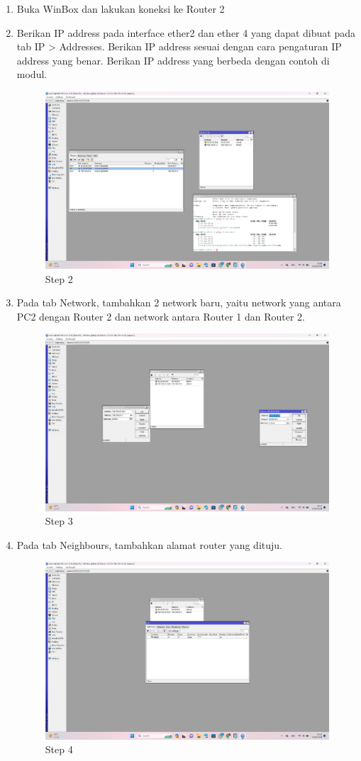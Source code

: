 \begin{enumerate}
	\item Buka WinBox dan lakukan koneksi ke Router 2
	
	\item Berikan IP address pada interface ether2 dan ether 4 yang dapat dibuat pada tab IP > Addresses. Berikan IP address sesuai dengan cara pengaturan IP address yang benar. Berikan IP
	address yang berbeda dengan contoh di modul.
	\begin{figure}[H]
		\centering
		\includegraphics[width=0.5\linewidth]{P2/img/dinamis_R2step2.jpg}
		\caption{Step 2}
		\label{fig:gambar13}
	\end{figure}
	
	\item Pada tab Network, tambahkan 2 network baru, yaitu network yang antara PC2 dengan Router
	2 dan network antara Router 1 dan Router 2.
	\begin{figure}[H]
		\centering
		\includegraphics[width=0.5\linewidth]{P2/img/dinamis_R2step3.2.jpg}
		\caption{Step 3}
		\label{fig:gambar13}
	\end{figure}

	\item Pada tab Neighbours, tambahkan alamat router yang dituju.
	\begin{figure}[H]
		\centering
		\includegraphics[width=0.5\linewidth]{P2/img/dinamis_R2step4.jpg}
		\caption{Step 4}
		\label{fig:gambar13}
	\end{figure}

\end{enumerate}

